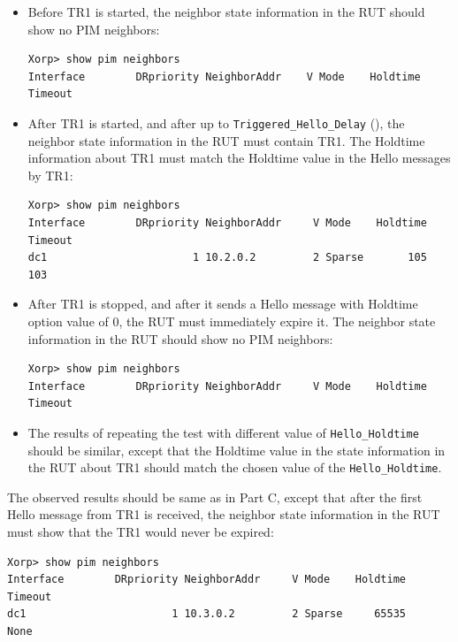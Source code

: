 \documentclass[11pt]{report}
\begin{document}

\begin{itemize}

  \item Before TR1 is started, the neighbor state information in the RUT
  should show no PIM neighbors:

\begin{verbatim}
Xorp> show pim neighbors
Interface        DRpriority NeighborAddr    V Mode    Holdtime Timeout
\end{verbatim}

  \item After TR1 is started, and after up to \verb=Triggered_Hello_Delay=
        ({\PimsmTriggeredHelloDelay}), the neighbor state information in the
        RUT must contain TR1. The Holdtime information about TR1 must match
        the Holdtime value in the Hello messages by TR1:

\begin{verbatim}
Xorp> show pim neighbors
Interface        DRpriority NeighborAddr     V Mode    Holdtime Timeout
dc1                       1 10.2.0.2         2 Sparse       105     103
\end{verbatim}

  \item After TR1 is stopped, and after it sends a Hello message with Holdtime
        option value of 0, the RUT must immediately expire it.
        The neighbor state information in the RUT should show no PIM
        neighbors:

\begin{verbatim}
Xorp> show pim neighbors
Interface        DRpriority NeighborAddr     V Mode    Holdtime Timeout
\end{verbatim}

  \item The results of repeating the test with different value of
        \verb=Hello_Holdtime= should be similar, except that the
        Holdtime value in the state information in the RUT about TR1 should
        match the chosen value of the \verb=Hello_Holdtime=.

\end{itemize}


The observed results should be same as in Part C, except that
after the first Hello message from TR1 is received, the neighbor state
information in the RUT must show that the TR1 would never be expired:

\begin{verbatim}
Xorp> show pim neighbors 
Interface        DRpriority NeighborAddr     V Mode    Holdtime Timeout
dc1                       1 10.3.0.2         2 Sparse     65535    None
\end{verbatim}
\end{document}
